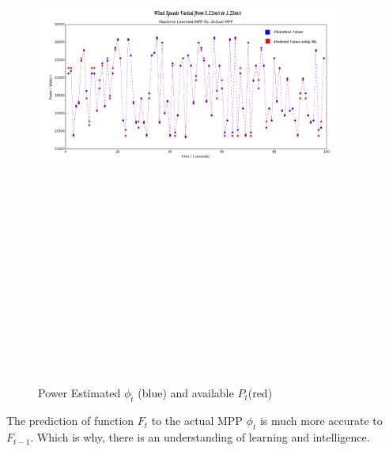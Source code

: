 \begin{center}
\begin{figure}
\includegraphics[width=10cm,height=20cm,keepaspectratio]{7.png}
\caption{Power Estimated $\phi_t$ (blue) and available $P_t$(red)}
\label{Fig:7}    
\end{figure}
\end{center}

The prediction of function $F_t$  to the actual MPP $\phi_t$ is much more accurate to$ F_{t-1}$. Which is why, there is an understanding of learning and intelligence. 

